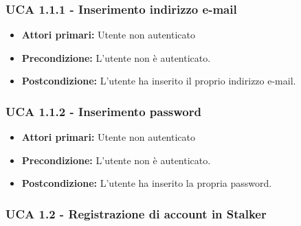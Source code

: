 \subsubsection{UCA 1.1.1 - Inserimento indirizzo e-mail}%
\begin{itemize}
\item \textbf{Attori primari:}  Utente non autenticato
\item \textbf{Precondizione:}  L'utente non è autenticato.
\item \textbf{Postcondizione:}  L'utente ha inserito il proprio indirizzo e-mail.
\end{itemize}

\subsubsection{UCA 1.1.2 - Inserimento password}%
\begin{itemize}
\item \textbf{Attori primari:} Utente non autenticato
\item \textbf{Precondizione:} L'utente non è autenticato.
\item \textbf{Postcondizione:} L'utente ha inserito la propria password.
\end{itemize}


\subsubsection{UCA 1.2 - Registrazione di account in Stalker}%

